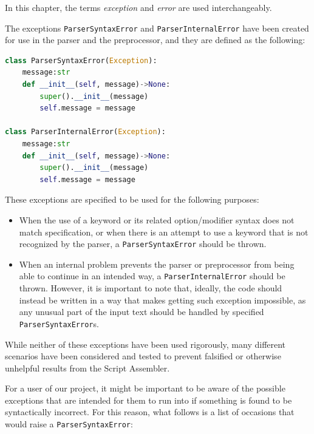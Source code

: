 In this chapter, the terms \textit{exception} and \textit{error} are used interchangeably. 

The exceptions \verb|ParserSyntaxError| and \verb|ParserInternalError| have been created for use in the parser and the preprocessor, and they are defined as the following:

\begin{lstlisting}[language=Python, caption={Class definitions of \texttt{ParserSyntaxError} and \texttt{ParserInternalError}.}, label={lst:class_definition_parser_syntax_internal_error}]
class ParserSyntaxError(Exception):
    message:str
    def __init__(self, message)->None:
        super().__init__(message)
        self.message = message

class ParserInternalError(Exception):
    message:str
    def __init__(self, message)->None:
        super().__init__(message)
        self.message = message
\end{lstlisting}

These exceptions are specified to be used for the following purposes:

\begin{itemize}
    \item When the use of a keyword or its related option/modifier syntax does not match specification, or when there is an attempt to use a keyword that is not recognized by the parser, a \verb|ParserSyntaxError| should be thrown. 
    \item When an internal problem prevents the parser or preprocessor from being able to continue in an intended way, a \verb|ParserInternalError| should be thrown. However, it is important to note that, ideally, the code should instead be written in a way that makes getting such exception impossible, as any unusual part of the input text should be handled by specified \verb|ParserSyntaxError|s. 
\end{itemize}

While neither of these exceptions have been used rigorously, many different scenarios have been considered and tested to prevent falsified or otherwise unhelpful results from the Script Assembler. 

For a user of our project, it might be important to be aware of the possible exceptions that are intended for them to run into if something is found to be syntactically incorrect. For this reason, what follows is a list of occasions that would raise a \verb|ParserSyntaxError|:

